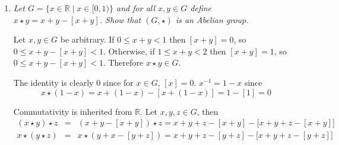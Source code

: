 \documentclass[letterpaper, 11pt]{article}
\begin{document}
\begin{enumerate}
\begin{enumerate}
\item \emph{Show that if $\alpha, \beta \in G$ then $\alpha\beta, \alpha^{-1} \in G$.}

Let $\alpha, \beta \in G$ and define $\alpha := \tau_x(a,b)$ and $\beta := \tau_x(c,d)$.  Since $(a,n) = 1$, $a^{-1}$ exists.  We claim $\alpha^{-1} = \gamma := \tau_x(a^{-1}, -a^{-1}b) \in G$.
\[
x(\gamma\alpha) \equiv a(a^{-1}x - a^{-1}b) + b) \equiv aa^{-1}x - aa^{-1}b + b \equiv x - b + b \equiv x \mbox{ (mod n)}
\]
and
\[
x(\alpha\gamma) \equiv a^{-1}(ax + b) - b) \equiv a^{-1}ax + a^{-1}ab - b \equiv x + b - b \equiv x \mbox{ (mod n)}
\]

Moreover,
\[
\alpha\beta = \overline{c(ax + b) + d} = \overline{cax + cb + d} = \tau_x(ca, cb+d) \in G
\]
\item \emph{Find $|G|$ if $n$ is prime.}

Let $\tau_x(a,b) = \tau_x(a',b')$ so that $ax+b \equiv a'x+b' \mbox{ (mod n)}$.  This implies $x(a-a') + (b-b') \equiv 0 \mbox{ (mod n)}$, i.e., $a \equiv a'$ and $b \equiv b' \mbox{ (mod n)}$.  In general this means there are $\varphi(n)$ ways to choose $a$, where $\varphi$ is Euler's totient function, and $n$ ways to choose $b$, and hence $|G| = n\varphi(n)$.  For $n$ prime $\varphi(n) = n-1$ (since all elements of $\mathbb{Z}_n \setminus \{0\}$ are units), so in this case $|G| = n(n-1)$.
\end{enumerate}

\item \emph{Let $G = \{x \in \mathbb{R} \mid x \in [0,1)\}$ and for all $x,y \in G$ define $x \star y = x+y - [x+y]$.  Show that $(G, \star)$ is an Abelian group.}

Let $x,y \in G$ be arbitrary.  If $0 \leq x+y < 1$ then $[x+y] = 0$, so $0 \leq x+y - [x+y] < 1$.  Otherwise, if $1 \leq x+y < 2$ then $[x+y] = 1$, so $0 \leq x+y - [x+y] < 1$.  Therefore $x \star y \in G$.

The identity is clearly $0$ since for $x \in G$, $[x] = 0$.  $x^{-1} = 1-x$ since 
\[
x \star (1-x) = x + (1 - x) - [x + (1 - x)] = 1 - [1] = 0
\]

Commutativity is inherited from $\mathbb{R}$.  Let $x,y,z \in G$, then
\begin{eqnarray*}
(x \star y) \star z &=& (x+y - [x+y]) \star z = x+y+z - [x+y] - \big[x+y+z - [x+y]\big] \\
x \star (y \star z) &=& x \star (y+x - [y+z]) = x+y+z - [y+z] - \big[x+y+z - [y+z]\big]
\end{eqnarray*}


\end{enumerate}
\end{document}
